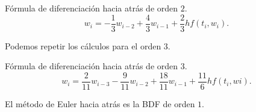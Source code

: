 \begin{method}
    Fórmula de diferenciación hacia atrás de orden $2$.
    \begin{equation*}
        w_i = - \frac{1}{3}w_{i-2} + \frac{4}{3}w_{i-1}
            + \frac{2}{3}hf(t_i, w_i).
    \end{equation*}
\end{method}

Podemos repetir los cálculos para el orden $3$.

\begin{method}
    Fórmula de diferenciación hacia atrás de orden $3$.
    \begin{equation*}
        w_i = \frac{2}{11}w_{i-3} - \frac{9}{11}w_{i-2} + \frac{18}{11}w_{i-1}
            + \frac{11}{6}hf(t_i, wi).
    \end{equation*}
\end{method}

\begin{remark}
    El método de Euler hacia atrás es la BDF de orden $1$.
\end{remark}

